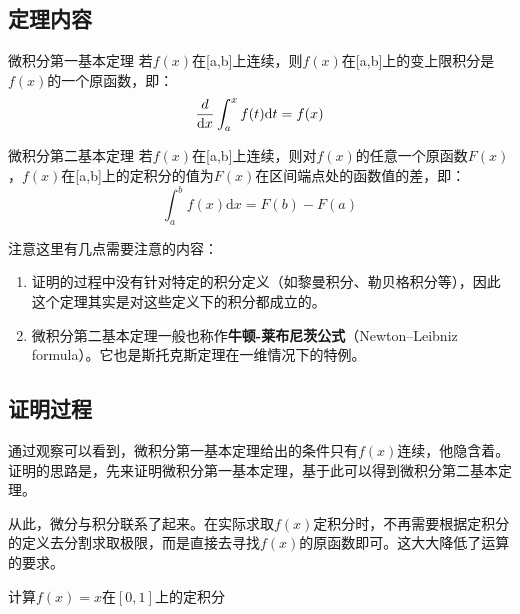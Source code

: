 \subsection{定理内容}

\begin{theorem}{微积分第一基本定理}
若$f(x)$在[a,b]上连续，则$f(x)$在[a,b]上的变上限积分是$f(x)$的一个原函数，即：
$${d\over\mathrm {d}x}\int_{a}^{x}f(t)\mathrm {d}t=f(x)$$
\end{theorem}

\begin{theorem}{微积分第二基本定理}
若$f(x)$在[a,b]上连续，则对$f(x)$的任意一个原函数$F(x)$，$f(x)$在[a,b]上的定积分的值为$F(x)$在区间端点处的函数值的差，即：
$$\int_{a}^{b} f(x)\mathrm {d}x=F(b)-F(a)$$
\end{theorem}

注意这里有几点需要注意的内容：
\begin{enumerate}
\item 证明的过程中没有针对特定的积分定义（如黎曼积分、勒贝格积分等），因此这个定理其实是对这些定义下的积分都成立的。
\item 微积分第二基本定理一般也称作\textbf{牛顿-莱布尼茨公式}（Newton–Leibniz formula）。它也是斯托克斯定理在一维情况下的特例。
\end{enumerate}

\subsection{证明过程}

通过观察可以看到，微积分第一基本定理给出的条件只有$f(x)$连续，他隐含着。证明的思路是，先来证明微积分第一基本定理，基于此可以得到微积分第二基本定理。




从此，微分与积分联系了起来。在实际求取$f(x)$定积分时，不再需要根据定积分的定义去分割求取极限，而是直接去寻找$f(x)$的原函数即可。这大大降低了运算的要求。
\begin{example}{}
计算$f(x)=x$在$[0,1]$上的定积分
\end{example}